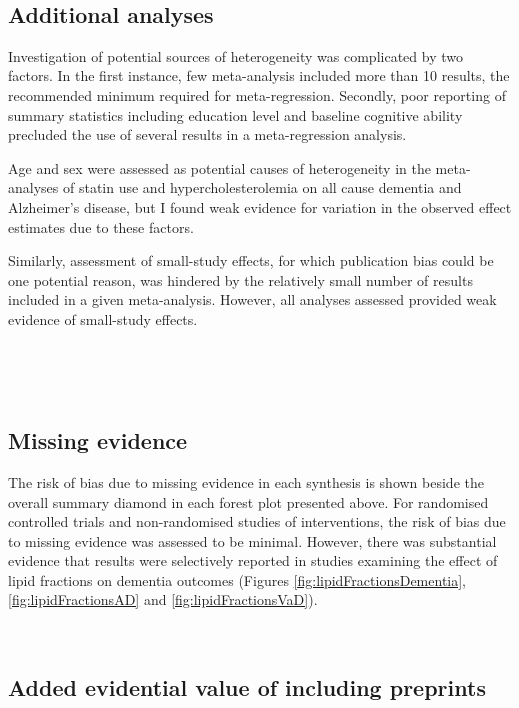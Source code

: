 \documentclass[a4paper, twoside]{templates/ociamthesis}
\begin{document}
~

\hypertarget{additional-analyses-1}{%
\subsection{Additional analyses}\label{additional-analyses-1}}

Investigation of potential sources of heterogeneity was complicated by two factors. In the first instance, few meta-analysis included more than 10 results, the recommended minimum required for meta-regression. Secondly, poor reporting of summary statistics including education level and baseline cognitive ability precluded the use of several results in a meta-regression analysis.

Age and sex were assessed as potential causes of heterogeneity in the meta-analyses of statin use and hypercholesterolemia on all cause dementia and Alzheimer's disease, but I found weak evidence for variation in the observed effect estimates due to these factors.

Similarly, assessment of small-study effects, for which publication bias could be one potential reason, was hindered by the relatively small number of results included in a given meta-analysis. However, all analyses assessed provided weak evidence of small-study effects.

~

~

\hypertarget{missing-evidence}{%
\subsection{Missing evidence}\label{missing-evidence}}

The risk of bias due to missing evidence in each synthesis is shown beside the overall summary diamond in each forest plot presented above. For randomised controlled trials and non-randomised studies of interventions, the risk of bias due to missing evidence was assessed to be minimal. However, there was substantial evidence that results were selectively reported in studies examining the effect of lipid fractions on dementia outcomes (Figures \ref{fig:lipidFractionsDementia}, \ref{fig:lipidFractionsAD} and \ref{fig:lipidFractionsVaD}).

~

\hypertarget{sys-rev-including-preprints-res}{%
\subsection{Added evidential value of including preprints}\label{sys-rev-including-preprints-res}}
\end{document}
